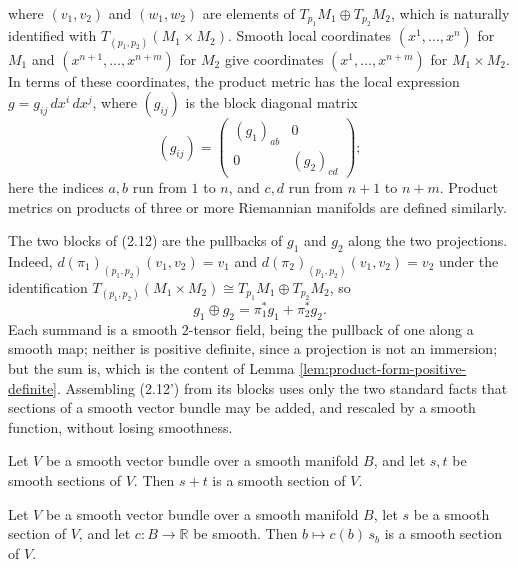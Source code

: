 where $(v_1, v_2)$ and $(w_1, w_2)$ are elements of $T_{p_1}M_1 \oplus T_{p_2}M_2$, which is naturally identified with $T_{(p_1,p_2)}(M_1 \times M_2)$. Smooth local coordinates $(x^1, \ldots, x^n)$ for $M_1$ and $(x^{n+1}, \ldots, x^{n+m})$ for $M_2$ give coordinates $(x^1, \ldots, x^{n+m})$ for $M_1 \times M_2$. In terms of these coordinates, the product metric has the local expression $g = g_{ij} \, dx^i \, dx^j$, where $(g_{ij})$ is the block diagonal matrix
\[
(g_{ij}) = \begin{pmatrix} (g_1)_{ab} & 0 \\ 0 & (g_2)_{cd} \end{pmatrix};
\]
here the indices $a, b$ run from $1$ to $n$, and $c, d$ run from $n+1$ to $n+m$. Product metrics on products of three or more Riemannian manifolds are defined similarly.

The two blocks of (2.12) are the pullbacks of $g_1$ and $g_2$ along the two projections. Indeed, $d(\pi_1)_{(p_1,p_2)}(v_1,v_2) = v_1$ and $d(\pi_2)_{(p_1,p_2)}(v_1,v_2) = v_2$ under the identification $T_{(p_1,p_2)}(M_1 \times M_2) \cong T_{p_1}M_1 \oplus T_{p_2}M_2$, so
\begin{equation}
g_1 \oplus g_2 = \pi_1^* g_1 + \pi_2^* g_2 . \tag{2.12'}
\end{equation}
Each summand is a smooth $2$-tensor field, being the pullback of one along a smooth map; neither is positive definite, since a projection is not an immersion; but the sum is, which is the content of Lemma \ref{lem:product-form-positive-definite}. Assembling (2.12') from its blocks uses only the two standard facts that sections of a smooth vector bundle may be added, and rescaled by a smooth function, without losing smoothness.

\begin{lemma}
\label{lem:smooth-tensor-field-add}
\mathlibok
Let $V$ be a smooth vector bundle over a smooth manifold $B$, and let $s, t$ be smooth sections of $V$. Then $s + t$ is a smooth section of $V$.
\end{lemma}

\begin{lemma}
\label{lem:smooth-tensor-field-smul}
\mathlibok
Let $V$ be a smooth vector bundle over a smooth manifold $B$, let $s$ be a smooth section of $V$, and let $c : B \to \mathbb{R}$ be smooth. Then $b \mapsto c(b)\,s_b$ is a smooth section of $V$.
\end{lemma}

